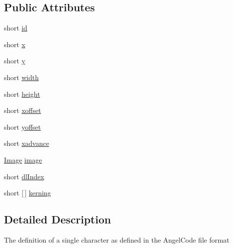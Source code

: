 \subsection*{Public Attributes}
\begin{DoxyCompactItemize}
\item 
short \mbox{\hyperlink{classorg_1_1newdawn_1_1slick_1_1_angel_code_font_1_1_char_def_af58fd816553227224d11f75664adc7e6}{id}}
\item 
short \mbox{\hyperlink{classorg_1_1newdawn_1_1slick_1_1_angel_code_font_1_1_char_def_a528f233655a70cbf7dcbae24d6bb3ae4}{x}}
\item 
short \mbox{\hyperlink{classorg_1_1newdawn_1_1slick_1_1_angel_code_font_1_1_char_def_a00004936be32e58efcc3b1da7d97108b}{y}}
\item 
short \mbox{\hyperlink{classorg_1_1newdawn_1_1slick_1_1_angel_code_font_1_1_char_def_a2a89d623dcb4a2faadfa804a76bdf6d9}{width}}
\item 
short \mbox{\hyperlink{classorg_1_1newdawn_1_1slick_1_1_angel_code_font_1_1_char_def_a22e24871275204c15c2e4a96875d8e57}{height}}
\item 
short \mbox{\hyperlink{classorg_1_1newdawn_1_1slick_1_1_angel_code_font_1_1_char_def_a8d1f56182f664e1a5eb87fc028c2445f}{xoffset}}
\item 
short \mbox{\hyperlink{classorg_1_1newdawn_1_1slick_1_1_angel_code_font_1_1_char_def_af7a97bd6030d18c7ef9dc4fecaf2639c}{yoffset}}
\item 
short \mbox{\hyperlink{classorg_1_1newdawn_1_1slick_1_1_angel_code_font_1_1_char_def_a55a9cc4b9dd1b1233f894b33d02c543b}{xadvance}}
\item 
\mbox{\hyperlink{classorg_1_1newdawn_1_1slick_1_1_image}{Image}} \mbox{\hyperlink{classorg_1_1newdawn_1_1slick_1_1_angel_code_font_1_1_char_def_ab62aa3bc9bf07629c6df438860b2fe73}{image}}
\item 
short \mbox{\hyperlink{classorg_1_1newdawn_1_1slick_1_1_angel_code_font_1_1_char_def_a2042f21c233fa57532a12cbe675134a4}{dl\+Index}}
\item 
short \mbox{[}$\,$\mbox{]} \mbox{\hyperlink{classorg_1_1newdawn_1_1slick_1_1_angel_code_font_1_1_char_def_a8eea71c0865ccf322a262f877cf4245b}{kerning}}
\end{DoxyCompactItemize}


\subsection{Detailed Description}
The definition of a single character as defined in the Angel\+Code file format


